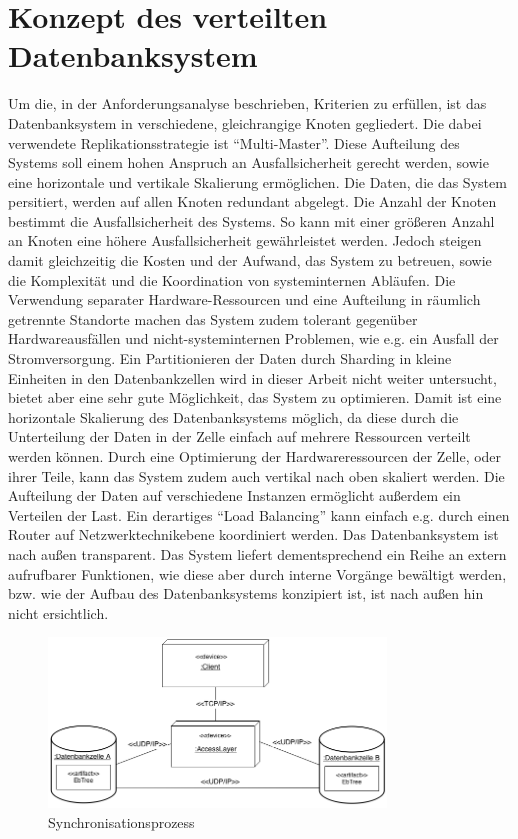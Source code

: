 \documentclass[a4paper,11pt,oneside,%
headsepline,												%
footsepline,												%
bibtotocnumbered									%
]{scrreprt}
\begin{document}
\section{Konzept des verteilten Datenbanksystem}
\label{sec:DBSystemConcept} 
Um die, in der Anforderungsanalyse beschrieben, Kriterien zu erfüllen, ist das Datenbanksystem  in verschiedene, gleichrangige Knoten gegliedert. Die dabei verwendete Replikationsstrategie ist \enquote{Multi-Master}. Diese Aufteilung des Systems  soll einem hohen Anspruch an Ausfallsicherheit gerecht werden, sowie eine horizontale und vertikale Skalierung ermöglichen. Die Daten, die das System persitiert, werden auf allen Knoten redundant abgelegt. Die Anzahl der Knoten bestimmt die Ausfallsicherheit des Systems. So kann mit einer größeren Anzahl an Knoten eine höhere Ausfallsicherheit gewährleistet werden. Jedoch steigen damit gleichzeitig die Kosten und der Aufwand, das System zu betreuen, sowie die Komplexität und die Koordination von systeminternen Abläufen. Die Verwendung separater Hardware-Ressourcen und eine Aufteilung in räumlich getrennte Standorte machen das System zudem tolerant gegenüber Hardwareausfällen und nicht-systeminternen Problemen, wie e.g. ein Ausfall der Stromversorgung. Ein Partitionieren  der Daten durch Sharding  in kleine Einheiten in den Datenbankzellen wird in dieser Arbeit nicht weiter untersucht, bietet aber eine sehr gute Möglichkeit, das System zu optimieren. Damit ist eine horizontale Skalierung des Datenbanksystems möglich, da diese durch die Unterteilung der Daten in der Zelle einfach auf mehrere Ressourcen verteilt werden können. Durch eine Optimierung der Hardwareressourcen der Zelle, oder ihrer Teile, kann das System zudem auch vertikal nach oben skaliert werden. Die Aufteilung der Daten auf verschiedene Instanzen ermöglicht außerdem  ein Verteilen der Last. Ein derartiges \enquote{Load Balancing} kann einfach e.g. durch einen Router auf Netzwerktechnikebene koordiniert werden. Das Datenbanksystem ist nach außen transparent. Das System liefert dementsprechend ein Reihe an extern aufrufbarer Funktionen, wie diese aber durch interne Vorgänge bewältigt werden, bzw. wie der Aufbau des Datenbanksystems konzipiert ist, ist nach außen hin nicht ersichtlich.
\begin{figure}[h!]
        \centering
    \includegraphics[width=0.8\textwidth]{bilder/uml_deployment_dia.png}
    \caption{Synchronisationsprozess}
\end{figure}
\end{document}
